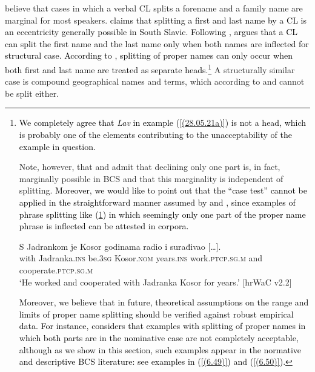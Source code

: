 \noindent \citet[37]{CavarWilder94} believe that cases in which a verbal CL splits a forename and a family name are marginal for most speakers. \textcolor{black}{\citet[3]{Boskovic01} claims that splitting a first and last name by a CL is an eccentricity generally possible in South Slavic. Following \citet[116]{Franks97}, \citet[16f, 29]{Boskovic01} argues that a CL can split the first name and the last name only when both names are inflected for structural case. According to \citet[116]{Franks97}, splitting of proper names can only occur when both first and last name are treated as separate heads.}\footnote{\textcolor{black}{We completely agree that \textit{Lav} in example (\ref{(28.05.21a)}) is not a head, which is probably one of the elements contributing to the unacceptability of the example in question.}
 
\begin{exe}
\end{exe}


\noindent Note, however, that \citet[116]{Franks97} and \citet[16]{Boskovic01} admit that declining only one part is, in fact, marginally possible in BCS and that this marginality is independent of splitting. \textcolor{black}{Moreover, we would like to point out that the “case test” cannot be applied in the straightforward manner assumed by \citet{Boskovic01} and \citet{Franks97}, since examples of phrase splitting like (\ref{(28.05.21b)}) in which seemingly only one part of the proper name phrase is inflected can be attested in corpora.}
 
\begin{exe}\ex\label{(28.05.21b)}
\gll S Jadrankom je Kosor godinama radio i {surađivao [\dots].}\\
 with Jadranka.\textsc{ins} be.\textsc{3sg} Kosor.\textsc{nom} years.\textsc{ins} work.\textsc{ptcp.sg.m} and cooperate.\textsc{ptcp.sg.m}\\
\glt ‘He worked and cooperated with Jadranka Kosor for years.’
\hfill  [hrWaC v2.2]
\end{exe}

\noindent \textcolor{black}{ Moreover, we believe that in future, theoretical assumptions on the range and limits of proper name splitting should be verified against robust empirical data. For instance, \citet[116]{Franks97} considers that examples with splitting of proper names in which both parts are in the nominative case are not completely acceptable, although as we show in this section, such examples appear in the normative and descriptive BCS literature: see examples in (\ref{(6.49)}) and (\ref{(6.50)}).}} A structurally similar case is compound geographical names and terms, which according to \citet[306f]{Pesikan58} and \citet[116]{RadanovicKocic88} cannot be split either.  

